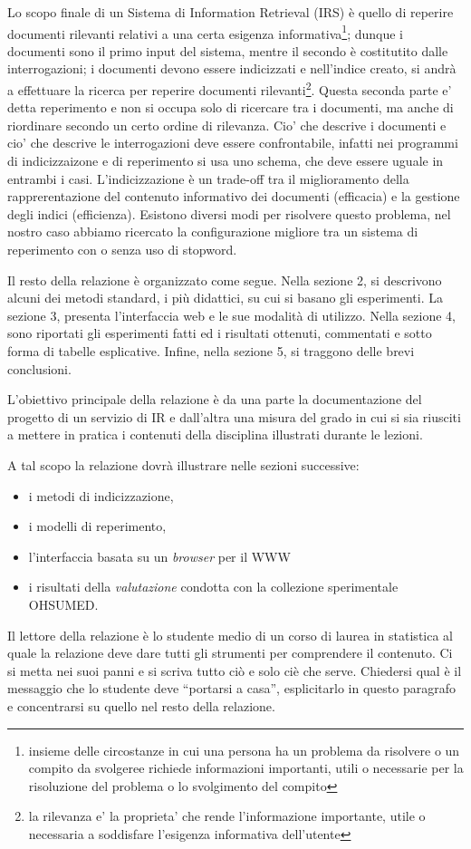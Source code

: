 \documentclass[runningheads]{llncs}
\begin{document}
Lo scopo finale di un Sistema di Information Retrieval (IRS) \`e quello di reperire documenti
 rilevanti relativi a una certa esigenza informativa\footnote{insieme delle circostanze in cui una
 persona ha un problema da risolvere o un compito da svolgeree richiede informazioni
 importanti, utili o necessarie per la risoluzione del problema o lo svolgimento del compito};
  dunque i documenti sono il primo input del sistema, mentre il secondo \`e
  costitutito dalle interrogazioni; i documenti devono essere
  indicizzati e nell'indice creato, si andr\`a a effettuare la ricerca per reperire documenti rilevanti\footnote{la rilevanza e' la proprieta' che rende l'informazione importante, utile o necessaria a soddisfare l'esigenza informativa dell'utente}. Questa seconda parte e' detta reperimento e non si occupa solo di ricercare tra i documenti, ma anche di riordinare secondo un certo ordine di rilevanza. Cio' che descrive i documenti e cio' che descrive le interrogazioni deve essere confrontabile, infatti nei programmi di indicizzaizone e di reperimento si usa uno schema, che deve essere uguale
  in entrambi i casi.
L'indicizzazione \`e un trade-off tra il  miglioramento della rapprerentazione del
contenuto informativo dei documenti (efficacia) e la gestione degli indici (efficienza).
Esistono diversi modi per risolvere questo problema, nel nostro caso abbiamo ricercato
la configurazione migliore tra un sistema di reperimento con o senza uso di stopword.


Il resto della relazione \`e organizzato come segue. Nella sezione 2, si descrivono
alcuni dei metodi standard, i pi\`u didattici, su cui si basano gli esperimenti.
La sezione 3, presenta l'interfaccia web e le sue modalit\`a di utilizzo.
Nella sezione 4, sono riportati gli esperimenti fatti ed i risultati ottenuti,
commentati e sotto forma di tabelle esplicative. Infine, nella sezione 5,
si traggono delle brevi conclusioni.




L'obiettivo principale della relazione \`e da una parte la
documentazione del progetto di un servizio di {IR} e dall'altra una
misura del grado in cui si sia riusciti a mettere in pratica i
contenuti della disciplina illustrati durante le lezioni.

A tal scopo la relazione dovr\`a illustrare nelle sezioni successive:
\begin{itemize}
\item i metodi di indicizzazione,
\item i modelli di reperimento,
\item l'interfaccia basata su un \textit{browser} per il {WWW}
\item i risultati della \emph{valutazione} condotta con la collezione
  sperimentale OHSUMED.
\end{itemize}
Il lettore della relazione \`e lo studente medio di un corso di laurea
in statistica al quale la relazione deve dare tutti gli strumenti per
comprendere il contenuto.  Ci si metta nei suoi panni e si scriva
tutto ci\`o e solo ci\`e che serve.  Chiedersi qual \`e il messaggio
che lo studente deve ``portarsi a casa'', esplicitarlo in questo
paragrafo e concentrarsi su quello nel resto della relazione.
\end{document}
